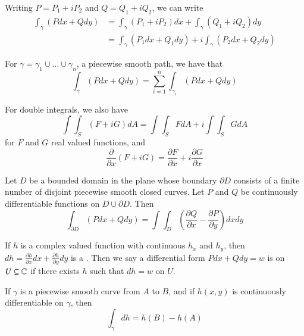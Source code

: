 Writing $P = P_1 + iP_2$ and $Q = Q_1+iQ_2$, we can write \begin{align*}
    \int_{\gamma}(Pdx+Qdy) &= \int_{\gamma}(P_1+iP_2)dx + \int_{\gamma}(Q_1+iQ_2)dy \\
    &= \int_{\gamma}(P_1dx+Q_1dy)+i\int_{\gamma}(P_2dx+Q_2dy)
\end{align*}

For $\gamma = \gamma_1\cup...\cup\gamma_n$, a piecewise smooth path, we have that \begin{equation*}
    \int_{\gamma}(Pdx+Qdy) = \sum_{i=1}^n\int_{\gamma_i}(Pdx+Qdy)
\end{equation*}


For double integrals, we also have \begin{equation*}
    \int\int_S(F+iG)dA = \int\int_SFdA + i\int\int_SGdA
\end{equation*}
for $F$ and $G$ real valued functions, and \begin{equation*}
    \frac{\partial}{\partial x}(F+iG) = \frac{\partial F}{\partial x}+i\frac{\partial G}{\partial x}
\end{equation*}

\begin{theorem}
    Let $D$ be a bounded domain in the plane whose boundary $\partial D$ consists of a finite number of disjoint piecewise smooth closed curves. Let $P$ and $Q$ be continuously differentiable functions on $D\cup \partial D$. Then \begin{equation*}
        \int_{\partial D}(Pdx+Qdy) = \int\int_D\left(\frac{\partial Q}{\partial x} - \frac{\partial P}{\partial y}\right)dxdy
    \end{equation*}
\end{theorem}

\begin{definition}
    If $h$ is a complex valued function with continuous $h_x$ and $h_y$, then $dh = \frac{\partial h}{\partial x}dx + \frac{\partial h}{\partial y}dy$ is a . Then we say a differential form $Pdx+Qdy = w$ is  on $U \subseteq \mathbb C$ if there exists $h$ such that $dh = w$ on $U$.
\end{definition}

\begin{theorem}
    If $\gamma$ is a piecewise smooth curve from $A$ to $B$, and if $h(x,y)$ is continuously differentiable on $\gamma$, then \begin{equation*}
        \int_{\gamma}dh = h(B) - h(A)
    \end{equation*}
\end{theorem}


